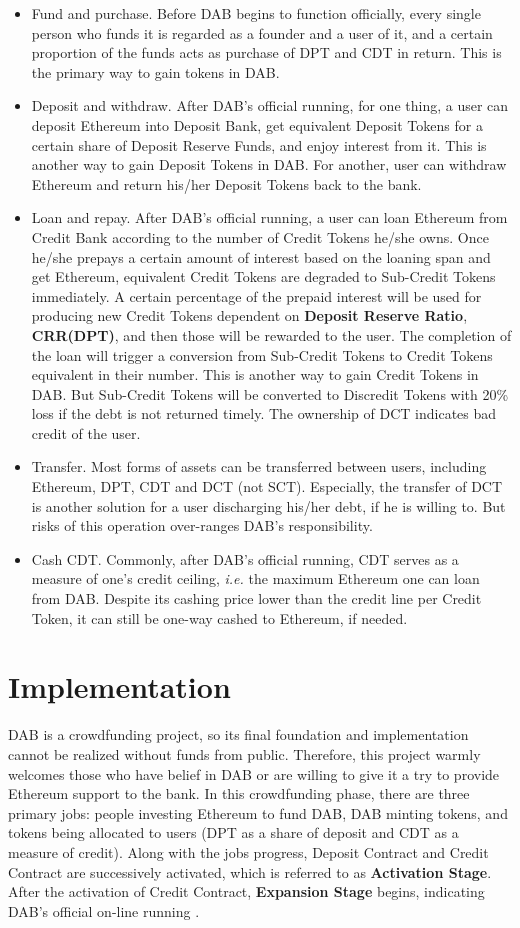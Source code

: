 \documentclass[review]{elsarticle}
\begin{document}
\begin{itemize}
   \item Fund and purchase. Before DAB begins to function officially, every single person who funds it is regarded as a founder and a user of it, and a certain proportion of the funds acts as purchase of DPT and CDT in return. This is the primary way to gain tokens in DAB.
   \item Deposit and withdraw. After DAB's official running, for one thing, a user can deposit Ethereum into Deposit Bank, get equivalent Deposit Tokens for a certain share of Deposit Reserve Funds, and enjoy interest from it. This is another way to gain Deposit Tokens in DAB. For another, user can withdraw Ethereum and return his/her Deposit Tokens back to the bank.
   \item Loan and repay. After DAB's official running, a user can loan Ethereum from Credit Bank according to the number of Credit Tokens he/she owns. Once he/she prepays a certain amount of interest based on the loaning span and get Ethereum, equivalent Credit Tokens are degraded to Sub-Credit Tokens immediately. A certain percentage of the prepaid interest will be used for producing new Credit Tokens dependent on \textbf{Deposit Reserve Ratio}, \textbf{CRR(DPT)}, and then those will be rewarded to the user. The completion of the loan will trigger a conversion from Sub-Credit Tokens to Credit Tokens equivalent in their number. This is another way to gain Credit Tokens in DAB. But Sub-Credit Tokens will be converted to Discredit Tokens with 20\% loss if the debt is not returned timely. The ownership of DCT indicates bad credit of the user.
   \item Transfer. Most forms of assets can be transferred between users, including Ethereum, DPT, CDT and DCT (not SCT). Especially, the transfer of DCT is another solution for a user discharging his/her debt, if he is willing to. But risks of this operation over-ranges DAB's responsibility.
   \item Cash CDT. Commonly, after DAB's official running, CDT serves as a measure of one's credit ceiling, \emph{i.e.} the maximum Ethereum one can loan from DAB. Despite its cashing price lower than the credit line per Credit Token, it can still be one-way cashed to Ethereum, if needed.
\end{itemize}

\section{Implementation}
DAB is a crowdfunding project, so its final foundation and implementation cannot be realized without funds from public. Therefore, this project warmly welcomes those who have belief in DAB or are willing to give it a try to provide Ethereum support to the bank. 
In this crowdfunding phase, there are three primary jobs: people investing Ethereum to fund DAB, DAB minting tokens, and tokens being allocated to users (DPT as a share of deposit and CDT as a measure of credit). Along with the jobs progress, Deposit Contract and Credit Contract are successively activated, which is referred to as \textbf{Activation Stage}. After the activation of Credit Contract, \textbf{Expansion Stage} begins, indicating DAB's official on-line running .
\end{document}
